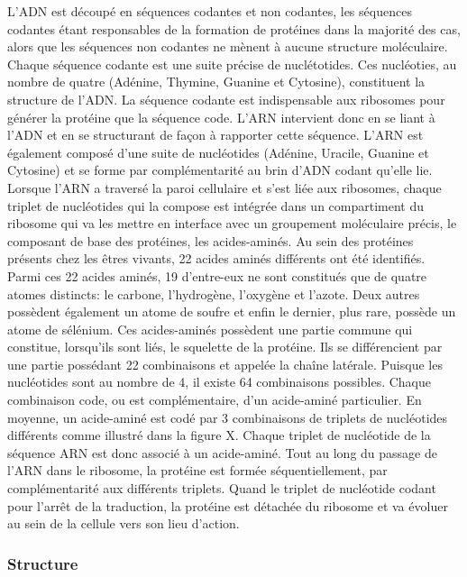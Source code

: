 L'ADN est découpé en séquences codantes et non codantes, les séquences codantes étant responsables de la formation de protéines dans la majorité des cas, alors que les séquences non codantes ne mènent à aucune structure moléculaire. Chaque séquence codante est une suite précise de nuclétotides. Ces nucléoties, au nombre de quatre (Adénine, Thymine, Guanine et Cytosine), constituent la structure de l'ADN. La séquence codante est indispensable aux ribosomes pour générer la protéine que la séquence code. L'ARN intervient donc en se liant à l'ADN et en se structurant de façon à rapporter cette séquence. L'ARN est également composé d'une suite de nucléotides (Adénine, Uracile, Guanine et Cytosine) et se forme par complémentarité au brin d'ADN codant qu'elle lie. Lorsque l'ARN a traversé la paroi cellulaire et s'est liée aux ribosomes, chaque triplet de nucléotides qui la compose est intégrée dans un compartiment du ribosome qui va les mettre en interface avec un groupement moléculaire précis, le composant de base des protéines, les acides-aminés. 
Au sein des protéines présents chez les êtres vivants, 22 acides aminés différents ont été identifiés. Parmi ces 22 acides aminés, 19 d'entre-eux ne sont constitués que de quatre atomes distincts: le carbone, l'hydrogène, l'oxygène et l'azote. Deux autres possèdent également un atome de soufre et enfin le dernier, plus rare, possède un atome de sélénium. Ces acides-aminés possèdent une partie commune qui constitue, lorsqu'ils sont liés, le squelette de la protéine. Ils se différencient par une partie possédant 22 combinaisons et appelée la chaîne latérale. Puisque les nucléotides sont au nombre de 4, il existe 64 combinaisons possibles. Chaque combinaison code, ou est complémentaire, d'un acide-aminé particulier. En moyenne, un acide-aminé est codé par 3 combinaisons de triplets de nucléotides différents comme illustré dans la figure X. Chaque triplet de nucléotide de la séquence ARN est donc associé à un acide-aminé. Tout au long du passage de l'ARN dans le ribosome, la protéine est formée séquentiellement, par complémentarité aux différents triplets. Quand le triplet de nucléotide codant pour l'arrêt de la traduction, la protéine est détachée du ribosome et va évoluer au sein de la cellule vers son lieu d'action.

\subsubsection{Structure} 

